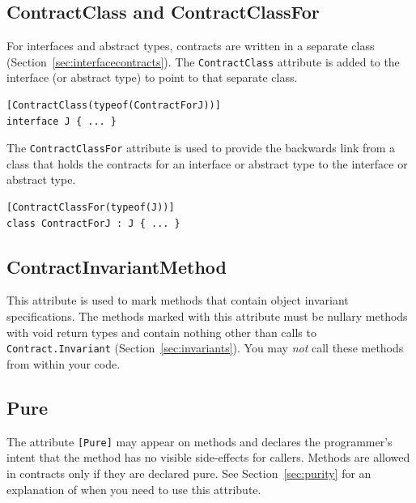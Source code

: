 \documentclass{article}
\newcommand{\code}[1]{\lstinline{#1}}
\newcommand{\comment}[1]{}
\begin{document}
\subsection{ContractClass and ContractClassFor}
\label{sec:contractclassattributes}
For interfaces and abstract types, contracts are written in a separate
class (Section~\ref{sec:interfacecontracts}). The \code{ContractClass}
attribute is added to the interface (or abstract type) to point to
that separate class.
\begin{lstlisting}
[ContractClass(typeof(ContractForJ))]
interface J { ... }
\end{lstlisting}
The \code{ContractClassFor} attribute is used to provide the backwards
link from a class that holds the contracts for an interface or
abstract type to the interface or abstract type.
\begin{lstlisting}
[ContractClassFor(typeof(J))]
class ContractForJ : J { ... }
\end{lstlisting}

\comment{
\subsection{Mutability}
This is an experimental attribute. It indicates how
``constant" a value of a particular type is. It can be applied to
classes and structures. (Not interfaces?) The values it can take on
are defined in the enumeration \code{Mutability}.
\begin{lstlisting}
public enum Mutability {
  Unspecified,
  Immutable, // read-only after construction, except for lazy initialization and caches
  // Do we need a "deeply immutable" value?
  Mutable,
  HasInitializationPhase, // read-only after some point
  // Do we need a value for mutable types with read-only wrapper subclasses?
}
\end{lstlisting}
}

\subsection{ContractInvariantMethod}
\label{sec:invariantattribute}
This attribute is used to
mark methods that contain object invariant specifications. The methods
marked with this attribute must be nullary methods with void return types
and contain nothing other than calls to \code{Contract.Invariant}
(Section~\ref{sec:invariants}).
You may {\em not} call these methods from within your code.

\subsection{Pure}
\label{sec:pureattribute}
The attribute \code{[Pure]} may appear on methods and declares the
programmer's intent that the method has no visible side-effects for
callers.  Methods are allowed in contracts only if they are declared pure. See
Section~\ref{sec:purity} for an explanation of when you need to
use this attribute.
\end{document}
